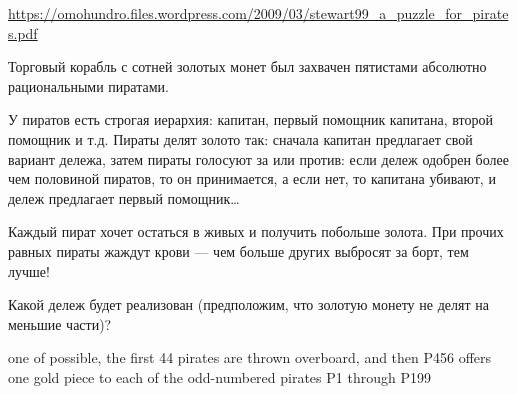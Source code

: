 \begin{problem} \par
\begin{source}
 \url{https://omohundro.files.wordpress.com/2009/03/stewart99_a_puzzle_for_pirates.pdf}
\end{source}
Торговый корабль с сотней золотых монет был захвачен пятистами абсолютно рациональными пиратами.  \par
У пиратов есть строгая иерархия: капитан, первый помощник капитана, второй помощник и т.д. Пираты делят золото так: сначала капитан предлагает свой вариант дележа, затем пираты голосуют за или против: если дележ одобрен более чем половиной пиратов, то он принимается, а если нет, то капитана убивают, и дележ предлагает первый помощник\ldots \par
Каждый пират хочет остаться в живых и получить побольше золота. При прочих равных пираты жаждут крови --- чем больше других выбросят за борт, тем лучше! \par
Какой дележ будет реализован (предположим, что золотую монету не делят на меньшие части)?

\begin{sol}

 one of possible, the first 44 pirates are thrown overboard, and then P456 offers
 one gold piece to each of the odd-numbered pirates P1 through P199
\end{sol}
\end{problem}







